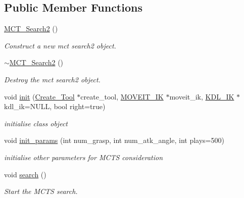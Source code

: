 \subsection*{Public Member Functions}
\begin{DoxyCompactItemize}
\item 
\mbox{\label{classMCT__Search2_a887bedfbb47a67f217c6b661b1de9f0c}} 
\hyperlink{classMCT__Search2_a887bedfbb47a67f217c6b661b1de9f0c}{M\+C\+T\+\_\+\+Search2} ()
\begin{DoxyCompactList}\small\item\em Construct a new mct search2 object. \end{DoxyCompactList}\item 
\mbox{\label{classMCT__Search2_aa3fe2b0773487f2eb40a91de50c55095}} 
\hyperlink{classMCT__Search2_aa3fe2b0773487f2eb40a91de50c55095}{$\sim$\+M\+C\+T\+\_\+\+Search2} ()
\begin{DoxyCompactList}\small\item\em Destroy the mct search2 object. \end{DoxyCompactList}\item 
void \hyperlink{classMCT__Search2_ac3b84aa47f5eaf6323419ad1711f9ad2}{init} (\hyperlink{classCreate__Tool}{Create\+\_\+\+Tool} $\ast$create\+\_\+tool, \hyperlink{classMOVEIT__IK}{M\+O\+V\+E\+I\+T\+\_\+\+IK} $\ast$moveit\+\_\+ik, \hyperlink{classKDL__IK}{K\+D\+L\+\_\+\+IK} $\ast$kdl\+\_\+ik=N\+U\+LL, bool right=true)
\begin{DoxyCompactList}\small\item\em initialise class object \end{DoxyCompactList}\item 
void \hyperlink{classMCT__Search2_aa29f243b21264b345036ee0692bd6fb4}{init\+\_\+params} (int num\+\_\+grasp, int num\+\_\+atk\+\_\+angle, int plays=500)
\begin{DoxyCompactList}\small\item\em initialise other parameters for M\+C\+TS consideration \end{DoxyCompactList}\item 
\mbox{\label{classMCT__Search2_ac6aa270d31c6cdb77e4783acf26e6958}} 
void \hyperlink{classMCT__Search2_ac6aa270d31c6cdb77e4783acf26e6958}{search} ()
\begin{DoxyCompactList}\small\item\em Start the M\+C\+TS search. \end{DoxyCompactList}\item 

\end{DoxyCompactItemize}
